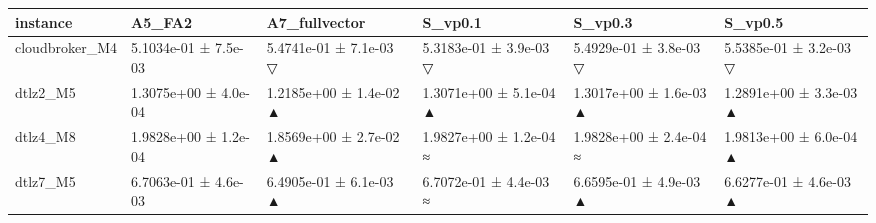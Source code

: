 \begin{tabular}{llllll}
\toprule
instance & A5\_FA2 & A7\_fullvector & S\_vp0.1 & S\_vp0.3 & S\_vp0.5 \\
\midrule
cloudbroker\_M4 & 5.1034e-01 ± 7.5e-03 & 5.4741e-01 ± 7.1e-03 ▽ & 5.3183e-01 ± 3.9e-03 ▽ & 5.4929e-01 ± 3.8e-03 ▽ & 5.5385e-01 ± 3.2e-03 ▽ \\
dtlz2\_M5 & 1.3075e+00 ± 4.0e-04 & 1.2185e+00 ± 1.4e-02 ▲ & 1.3071e+00 ± 5.1e-04 ▲ & 1.3017e+00 ± 1.6e-03 ▲ & 1.2891e+00 ± 3.3e-03 ▲ \\
dtlz4\_M8 & 1.9828e+00 ± 1.2e-04 & 1.8569e+00 ± 2.7e-02 ▲ & 1.9827e+00 ± 1.2e-04 ≈ & 1.9828e+00 ± 2.4e-04 ≈ & 1.9813e+00 ± 6.0e-04 ▲ \\
dtlz7\_M5 & 6.7063e-01 ± 4.6e-03 & 6.4905e-01 ± 6.1e-03 ▲ & 6.7072e-01 ± 4.4e-03 ≈ & 6.6595e-01 ± 4.9e-03 ▲ & 6.6277e-01 ± 4.6e-03 ▲ \\
\bottomrule
\end{tabular}
